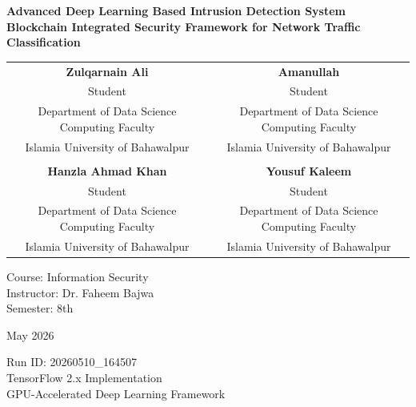 \documentclass[12pt,a4paper]{report}
\begin{document}
\begin{titlepage}
\begin{center}
\vspace*{1cm}

{\Huge\bfseries Advanced Deep Learning Based Intrusion Detection System\\[0.5cm]}
{\Large\bfseries Blockchain Integrated Security Framework for Network Traffic Classification\\[2cm]}

\vspace{1cm}

\begin{tabular}{cc}
\textbf{Zulqarnain Ali} & \textbf{Amanullah} \\
Student & Student \\
Department of Data Science Computing Faculty & Department of Data Science Computing Faculty \\
Islamia University of Bahawalpur & Islamia University of Bahawalpur \\
\\
\textbf{Hanzla Ahmad Khan} & \textbf{Yousuf Kaleem} \\
Student & Student \\
Department of Data Science Computing Faculty & Department of Data Science Computing Faculty \\
Islamia University of Bahawalpur & Islamia University of Bahawalpur \\
\end{tabular}

\vspace{2cm}

{\large Course: Information Security\\[0.3cm]}
{\large Instructor: Dr. Faheem Bajwa\\[0.3cm]}
{\large Semester: 8th\\[0.5cm]}

{\large May 2026\\[0.5cm]}

\vfill

{\small Run ID: 20260510\_164507\\
TensorFlow 2.x Implementation\\
GPU-Accelerated Deep Learning Framework}

\end{center}
\end{titlepage}
\end{document}
